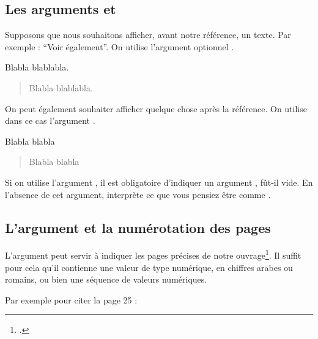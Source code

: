 \subsection{Les arguments  et }

Supposons que nous souhaitons afficher, avant notre référence, un texte. Par exemple : \enquote{Voir également}. On utilise l'argument optionnel .

\begin{latexcode}
Blabla \autocite[Voir également][]{Saxer1980} blablabla.
\end{latexcode}

\begin{quotation}
Blabla \cite[Voir également][]{Saxer1980} blablabla.
\end{quotation}



On peut également souhaiter afficher quelque chose après la référence. On utilise dans ce cas l'argument .

\begin{latexcode}
Blabla \autocite[Voir également][qui porte sur un
sujet similaire.]{Saxer1980} blabla
\end{latexcode}

\begin{quotation}
Blabla \cite[Voir également][qui porte sur un sujet similaire.]{Saxer1980} blabla
\end{quotation}

\begin{attention}
Si on utilise l'argument , il est obligatoire d'indiquer un argument , fût-il vide. En l'absence de cet argument,  interprète  ce que vous pensiez être  comme .
\end{attention}

\subsection{L'argument  et la numérotation des pages}\label{pagespostnote}

L'argument  peut servir à indiquer les pages précises de notre ouvrage\footcite[On consultera pour plus de détails : ][]{biblatex_pages}. Il suffit pour cela qu'il contienne une valeur de type numérique, en chiffres arabes ou romains, ou bien une séquence de valeurs numériques.

Par exemple pour citer la page 25 : 

